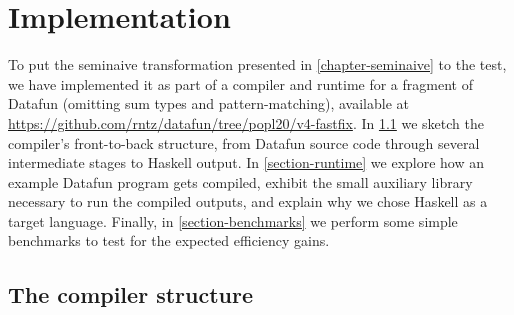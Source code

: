 \section{Implementation}
\label{section-implementation}

To put the seminaive transformation presented in \cref{chapter-seminaive} to the test, we have implemented it as part of a compiler and runtime for a fragment of Datafun (omitting sum types and pattern-matching), available at \url{https://github.com/rntz/datafun/tree/popl20/v4-fastfix}.
%
In \cref{section-compiler} we sketch the compiler's front-to-back structure, from Datafun source code through several intermediate stages to Haskell output.
%
In \cref{section-runtime} we explore how an example Datafun program gets compiled, exhibit the small auxiliary library necessary to run the compiled outputs, and explain why we chose Haskell as a target language.
%
%
Finally, in \cref{section-benchmarks} we perform some simple benchmarks to test for the expected efficiency gains.




\subsection{The compiler structure}\label{section-compiler}

